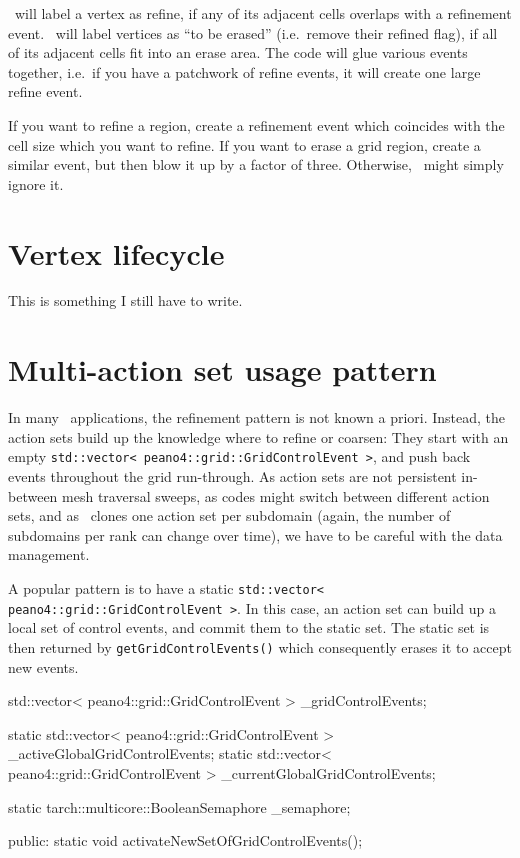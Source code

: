 \Peano\ will label a vertex as refine, if any of its adjacent cells overlaps
with a refinement event.
\Peano\ will label vertices as ``to be erased'' (i.e.~remove their refined
flag), if all of its adjacent cells fit into an erase area.
The code will glue various events together, i.e.~if you have a patchwork of
refine events, it will create one large refine event.

\begin{remark}
  If you want to refine a region, create a refinement event which coincides with
  the cell size which you want to refine.
  If you want to erase a grid region, create a similar event, but then blow it
  up by a factor of three.
  Otherwise, \Peano\ might simply ignore it.
\end{remark}


\section{Vertex lifecycle}

\begin{remark}
 This is something I still have to write.
\end{remark}


\section{Multi-action set usage pattern}

In many \Peano\ applications, the refinement pattern is not known a priori.
Instead, the action sets build up the knowledge where to refine or coarsen:
They start with an empty \texttt{std::vector< peano4::grid::GridControlEvent >},
and push back events throughout the grid run-through.
As action sets are not persistent in-between mesh traversal sweeps, as codes
might switch between different action sets, and as \Peano\ clones one action set
per subdomain (again, the number of subdomains per rank can change over time),
we have to be careful with the data management. 


A popular pattern is to have a static \texttt{std::vector<
peano4::grid::GridControlEvent >}. In this case, an action set can build up a 
local set of control events, and commit them to the static set.
The static set is then returned by \texttt{getGridControlEvents()} which
consequently erases it to accept new events.


\begin{code}
  std::vector< peano4::grid::GridControlEvent >   _gridControlEvents;

  static std::vector< peano4::grid::GridControlEvent >   _activeGlobalGridControlEvents;
  static std::vector< peano4::grid::GridControlEvent >   _currentGlobalGridControlEvents;

  static tarch::multicore::BooleanSemaphore _semaphore;

public:
  static void activateNewSetOfGridControlEvents();
\end{code}

